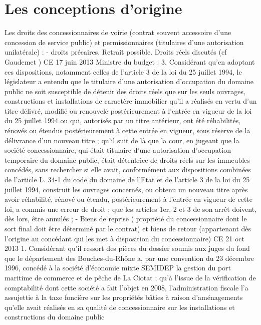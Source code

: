 \documentclass[11pt,a4paper]{report}
\begin{document}
\section{Les conceptions d’origine}
Les droits des concessionnaires de voirie (contrat souvent accessoire d’une concession de service
public) et permissionnaires (titulaires d’une autorisation unilatérale) :
- droits précaires. Retrait possible. Droits réels discutés (cf Gaudemet )
CE 17 juin 2013  Ministre du budget : 3. Considérant qu'en adoptant ces dispositions,
notamment celles de l'article 3 de la loi du 25 juillet 1994, le législateur a entendu que le titulaire d'une
autorisation d'occupation du domaine public ne soit susceptible de détenir des droits réels que sur les
seuls ouvrages, constructions et installations de caractère immobilier qu'il a réalisés en vertu d'un titre
délivré, modifié ou renouvelé postérieurement à l'entrée en vigueur de la loi du 25 juillet 1994 ou qui,
autorisés par un titre antérieur, ont été réhabilités, rénovés ou étendus postérieurement à cette entrée
en vigueur, sous réserve de la délivrance d'un nouveau titre ; qu'il suit de là que la cour, en jugeant que
la société concessionnaire, qui était titulaire d'une autorisation d'occupation temporaire du domaine
public, était détentrice de droits réels sur les immeubles concédés, sans rechercher si elle avait,
conformément aux dispositions combinées de l'article L. 34-1 du code du domaine de l'Etat et de
l'article 3 de la loi du 25 juillet 1994, construit les ouvrages concernés, ou obtenu un nouveau titre
après avoir réhabilité, rénové ou étendu, postérieurement à l'entrée en vigueur de cette loi, a commis
une erreur de droit ; que les articles 1er, 2 et 3 de son arrêt doivent, dès lors, être annulés ;
- Biens de reprise ( propriété du concessionnaire dont le sort final doit être déterminé par le contrat) et
biens de retour (appartenant dès l’origine au concédant qui les met à disposition du concessionnaire)
CE 21 oct 2013  1. Considérant qu'il ressort des pièces du dossier soumis aux juges du fond
que le département des Bouches-du-Rhône a, par une convention du 23 décembre 1996, concédé à la
société d'économie mixte SEMIDEP la gestion du port maritime de commerce et de pêche de La Ciotat ;
qu'à l'issue de la vérification de comptabilité dont cette société a fait l'objet en 2008, l'administration
fiscale l'a assujettie à la taxe foncière sur les propriétés bâties à raison d'aménagements qu'elle avait
réalisés en sa qualité de concessionnaire sur les installations et constructions du domaine public
\end{document}
